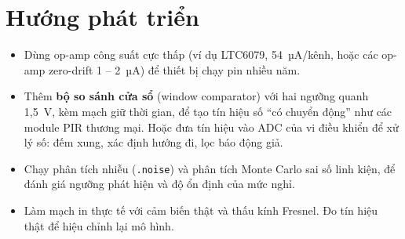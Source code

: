 \section{Hướng phát triển}

\begin{itemize}
  \item Dùng op-amp công suất cực thấp (ví dụ LTC6079, 54~µA/kênh, hoặc các op-amp zero-drift 1 -- 2~µA) để thiết bị chạy pin nhiều năm.
  \item Thêm \textbf{bộ so sánh cửa sổ} (window comparator) với hai ngưỡng quanh 1,5~V, kèm mạch giữ thời gian, để tạo tín hiệu số ``có chuyển động'' như các module PIR thương mại. Hoặc đưa tín hiệu vào ADC của vi điều khiển để xử lý số: đếm xung, xác định hướng đi, lọc báo động giả.
  \item Chạy phân tích nhiễu (\texttt{.noise}) và phân tích Monte Carlo sai số linh kiện, để đánh giá ngưỡng phát hiện và độ ổn định của mức nghỉ.
  \item Làm mạch in thực tế với cảm biến \PYD{} thật và thấu kính Fresnel. Đo tín hiệu thật để hiệu chỉnh lại mô hình.
\end{itemize}
